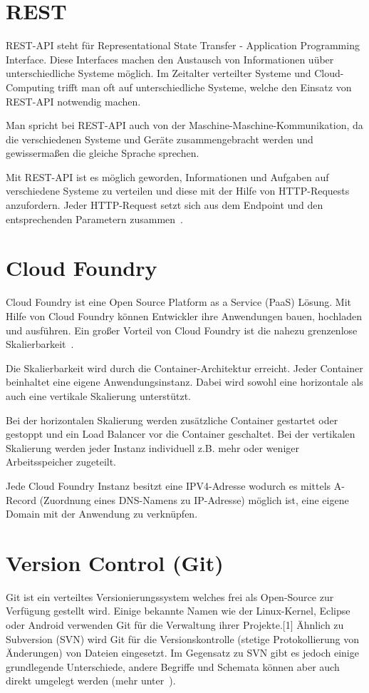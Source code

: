 \section{REST}
REST-API steht für Representational State Transfer - Application Programming Interface. Diese Interfaces machen den
Austausch von Informationen uüber unterschiedliche Systeme möglich. Im Zeitalter verteilter Systeme und Cloud-Computing
trifft man oft auf unterschiedliche Systeme, welche den Einsatz von REST-API notwendig machen.

Man spricht bei REST-API auch von der Maschine-Maschine-Kommunikation, da die verschiedenen Systeme und Geräte
zusammengebracht werden und gewissermaßen die gleiche Sprache sprechen.

Mit REST-API ist es möglich geworden, Informationen und Aufgaben auf verschiedene Systeme zu verteilen und diese mit der
Hilfe von HTTP-Requests anzufordern. Jeder HTTP-Request setzt sich aus dem Endpoint und den entsprechenden Parametern
zusammen~\cite{online_grundlagen_rest}.

\section{Cloud Foundry}
Cloud Foundry ist eine Open Source Platform as a Service (PaaS) Lösung. Mit Hilfe von Cloud Foundry können Entwickler
ihre Anwendungen bauen, hochladen und ausführen. Ein großer Vorteil von Cloud Foundry ist die nahezu grenzenlose
Skalierbarkeit~\cite{book_grundlagen_cloudfoundry}.

Die Skalierbarkeit wird durch die Container-Architektur erreicht. Jeder Container beinhaltet eine eigene Anwendungsinstanz.
Dabei wird sowohl eine horizontale als auch eine vertikale Skalierung unterstützt.

Bei der horizontalen Skalierung werden zusätzliche Container gestartet oder gestoppt und ein Load Balancer vor die
Container geschaltet. Bei der vertikalen Skalierung werden jeder Instanz individuell z.B. mehr oder weniger Arbeitsspeicher
zugeteilt.

Jede Cloud Foundry Instanz besitzt eine IPV4-Adresse wodurch es mittels A-Record (Zuordnung eines DNS-Namens zu IP-Adresse)
möglich ist, eine eigene Domain mit der Anwendung zu verknüpfen.

\section{Version Control (Git)}
Git ist ein verteiltes Versionierungssystem welches frei als Open-Source zur Verfügung gestellt wird. Einige bekannte
Namen wie der Linux-Kernel, Eclipse oder Android verwenden Git für die Verwaltung ihrer Projekte.[1] Ähnlich zu
Subversion (SVN) wird Git für die Versionskontrolle (stetige Protokollierung von Änderungen) von Dateien eingesetzt. Im
Gegensatz zu SVN gibt es jedoch einige grundlegende Unterschiede, andere Begriffe und Schemata können aber auch direkt
umgelegt werden (mehr unter~\cite{book_grundlagen_git}).

